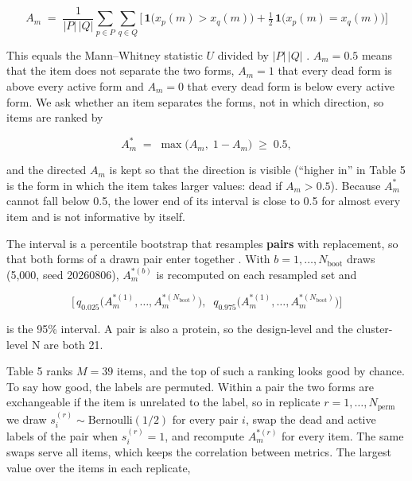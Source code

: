 \documentclass[
  10pt,
]{article}
\DeclareRobustCommand{\_}{\textunderscore\hspace{0pt}}
\begin{document}
\begin{equation*}A_m \;=\; \frac{1}{|P|\,|Q|}\sum_{p \in P}\sum_{q \in Q}\Big[\,\mathbf{1}\big(x_p(m) > x_q(m)\big) + \tfrac{1}{2}\,\mathbf{1}\big(x_p(m) = x_q(m)\big)\Big] \tag{1}\end{equation*}

This equals the
Mann--Whitney
statistic \(U\)
divided by
\(|P|\,|Q|\)
\cite{mann1947}.
\(A_m = 0.5\) means
that the item does
not separate the two
forms, \(A_m = 1\)
that every dead form
is above every
active form and
\(A_m = 0\) that
every dead form is
below every active
form. We ask whether
an item separates
the forms, not in
which direction, so
items are ranked by

\begin{equation*}A^{*}_m \;=\; \max\!\big(A_m,\; 1 - A_m\big) \;\ge\; 0.5 , \tag{2}\end{equation*}

and the directed
\(A_m\) is kept so
that the direction
is visible (``higher
in'' in Table 5 is
the form in which
the item takes
larger values: dead
if \(A_m > 0.5\)).
Because \(A^{*}_m\)
cannot fall below
0.5, the lower end
of its interval is
close to 0.5 for
almost every item
and is not
informative by
itself.

The interval is a
percentile bootstrap
that resamples
\textbf{pairs} with
replacement, so that
both forms of a
drawn pair enter
together
\cite{efron1979,field2007}.
With
\(b = 1,\dots,N_{\mathrm{boot}}\)
draws (5,000, seed
20260806),
\(A^{*(b)}_m\) is
recomputed on each
resampled set and

\begin{equation*}\Big[\,q_{0.025}\big(A^{*(1)}_m,\dots,A^{*(N_{\mathrm{boot}})}_m\big),\;\; q_{0.975}\big(A^{*(1)}_m,\dots,A^{*(N_{\mathrm{boot}})}_m\big)\Big] \tag{3}\end{equation*}

is the 95\%
interval. A pair is
also a protein, so
the design-level and
the cluster-level N
are both 21.

Table 5 ranks
\(M = 39\) items,
and the top of such
a ranking looks good
by chance. To say
how good, the labels
are permuted. Within
a pair the two forms
are exchangeable if
the item is
unrelated to the
label, so in
replicate
\(r = 1,\dots,N_{\mathrm{perm}}\)
we draw
\(s_i^{(r)} \sim \mathrm{Bernoulli}(1/2)\)
for every pair
\(i\), swap the dead
and active labels of
the pair when
\(s_i^{(r)} = 1\),
and recompute
\(A^{*(r)}_m\) for
every item. The same
swaps serve all
items, which keeps
the correlation
between metrics. The
largest value over
the items in each
replicate,
\end{document}
